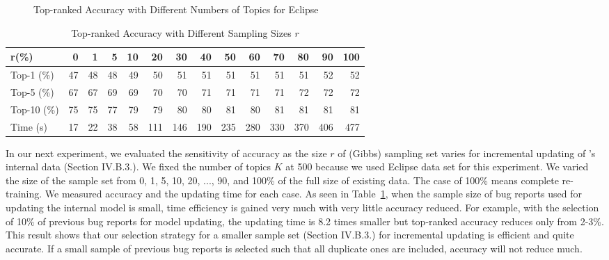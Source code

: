 \begin{figure}[t]
\centerline{\epsfxsize=3.3in }
\caption{Top-ranked Accuracy with Different Numbers of Topics for Eclipse}
\label{sensitive}
\end{figure}


\begin{table}[t]
\centering
\caption{Top-ranked Accuracy with Different Sampling Sizes $r$}
\setlength{\tabcolsep}{2.5pt}
\begin{tabular}{|l||r|r|r|r|r|r|r|r|r|r|r|r|r|}
\hline
   r(\%) & 0 & 1 & 5 & 10 & 20 & 30 & 40 & 50 & 60 & 70 & 80 & 90 & 100\\
\hline
   Top-1 (\%) & 47 & 48 & 48 & 49 & 50 & 51 & 51 & 51 & 51 & 51 & 51 & 52 & 52\\
   Top-5 (\%) & 67 & 67 & 69 & 69 & 70 & 70 & 71 & 71 & 71 & 71 & 72 & 72 & 72\\
   Top-10 (\%) & 75 & 75 & 77 & 79 & 79 & 80 & 80 & 81 & 80 & 81 & 81 & 81 & 81\\
\hline
   Time (s) & 17 & 22 & 38 & 58 & 111 & 146 & 190 & 235 & 280 & 330 & 370 & 406 & 477\\
\hline
\end{tabular}
\label{tradeoff}
\end{table}

In our next experiment, we evaluated the sensitivity of accuracy as
the size $r$ of (Gibbs) sampling set varies for incremental updating of
{\model}'s internal data (Section IV.B.3.). We fixed the number of
topics $K$ at 500 because we used Eclipse data set for this
experiment. We varied the size of the sample set from 0, 1, 5, 10,
20, ..., 90, and 100\% of the full size of existing data. The case of
100\% means complete re-training. We measured accuracy and the
updating time for each case. As seen in Table~\ref{tradeoff}, when the
sample size of bug reports used for updating the internal model is
small, time efficiency is gained very much with very little accuracy
reduced. For example, with the selection of 10\% of previous bug
reports for model updating, the updating time is 8.2 times smaller but
top-ranked accuracy reduces only from 2-3\%. This result shows that
our selection strategy for a smaller sample set (Section IV.B.3.) for
incremental updating is efficient and quite accurate. If a small
sample of previous bug reports is selected such that all duplicate
ones are included, accuracy will not reduce much.


